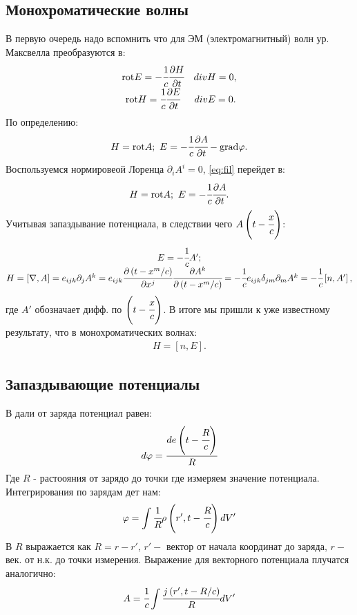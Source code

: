 \documentclass[a4paper]{article}
\newcommand{\inner}[1]{\left( #1 \right)}
\newcommand{\insqr}[1]{\left[ #1 \right]}
\newcommand{\rot}{\text{rot}}
\renewcommand{\grad}{\text{grad}}
\renewcommand{\phi}{\varphi}
\numberwithin{equation}{section}
\begin{document}
\subsection{Монохроматические волны}
В первую очередь надо вспомнить что для ЭМ (электромагнитный) волн 
ур. Максвелла преобразуются в:
\begin{gather}
    \begin{matrix}
        \rot E = -\cfrac{1}{c} \cfrac{\partial H}{\partial t} & div H = 0, \\
        \rot H = \cfrac{1}{c} \cfrac{\partial E}{\partial t} & div E = 0.
    \end{matrix}
\end{gather} 
По определению:
\begin{eqnarray}
    H = \rot A; \ 
    E = -\cfrac{1}{c}\cfrac{\partial A}{\partial t} - \grad \phi .
    \label{eq:fil}
\end{eqnarray} 
Воспользуемся нормировеой Лоренца $\partial_i A^i = 0$, \ref{eq:fil} перейдет в:
\begin{eqnarray}
    H = \rot A; \ E = -\cfrac{1}{c}\cfrac{\partial A}{\partial t}.
\end{eqnarray} 
Учитывая запаздывание потенциала, в следствии чего $A\inner{t - \cfrac{x}{c}}$:
\begin{gather}
    \begin{matrix}
    E = -\cfrac{1}{c} A' ; \\ 
    H = \insqr{\nabla, A} = e_{ijk} \partial_j A^k = 
    e_{ijk} \cfrac{\partial \inner{t - x^m /c}}{\partial x^j}  
    \cfrac{\partial A^k}{\partial \inner{t - x^m /c}} =
    -\cfrac{1}{c}e_{ijk} \delta_{jm} \partial_{m} A^k = 
    -\cfrac{1}{c}\insqr{n, A'},
    \end{matrix}
\end{gather}
где $A'$ обозначает дифф. по $\inner{t - \cfrac{x}{c}}$. 
В итоге мы пришли к уже известному результату, что в 
монохроматических волнах:
\begin{eqnarray}
    H = \insqr{n, E}.
\end{eqnarray} 

\subsection{Запаздывающие потенциалы}
В дали от заряда потенциал равен:
\begin{equation}
    d\phi = \cfrac{d e \inner{t - \cfrac{R}{c}}}{R}
\end{equation}
Где $R$ - растоояния от зарядо до точки где измеряем значение потенциала. 
Интегрирования по зарядам дет нам:
\begin{equation}
    \phi = \int \cfrac{1}{R} \rho\inner{r', t - \cfrac{R}{c}} dV'
\end{equation}
В $R $ выражается как $R = r - r'$,  $r' -$ 
вектор от начала координат до заряда, $r -$ 
век. от н.к. до точки измерения. Выражение для 
векторного потенциала плучатся аналогично:
\begin{equation}
    A = \cfrac{1}{c} \int \cfrac{j \inner{r',t - R/c}}{R} dV' 
\end{equation}
\end{document}
